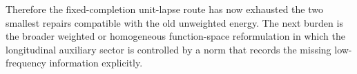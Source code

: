\documentclass[11pt]{article}
\begin{document}
Therefore the fixed-completion unit-lapse route has now exhausted the two smallest repairs compatible with the old unweighted energy. The next burden is the broader weighted or homogeneous function-space reformulation in which the longitudinal auxiliary sector is controlled by a norm that records the missing low-frequency information explicitly.
\end{document}
